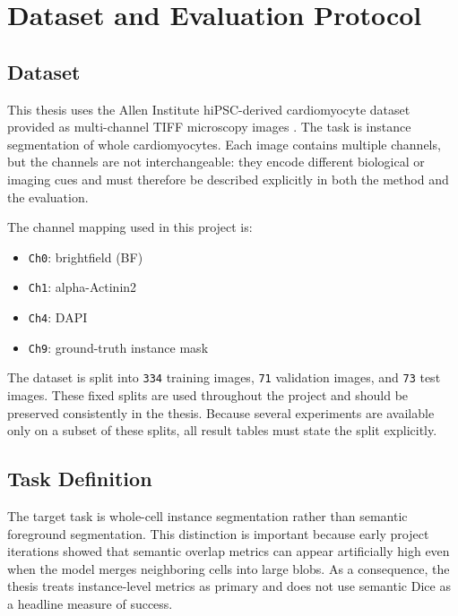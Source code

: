 \section{Dataset and Evaluation Protocol}\label{dataset-and-evaluation-protocol}

\subsection{Dataset}\label{dataset}

This thesis uses the Allen Institute hiPSC-derived cardiomyocyte dataset provided as multi-channel TIFF microscopy images \cite{rafelski2024allen}. The task is instance segmentation of whole cardiomyocytes. Each image contains multiple channels, but the channels are not interchangeable: they encode different biological or imaging cues and must therefore be described explicitly in both the method and the evaluation.

The channel mapping used in this project is:

\begin{itemize}
\tightlist
\item
  \texttt{Ch0}: brightfield (BF)
\item
  \texttt{Ch1}: alpha-Actinin2
\item
  \texttt{Ch4}: DAPI
\item
  \texttt{Ch9}: ground-truth instance mask
\end{itemize}

The dataset is split into \texttt{334} training images, \texttt{71} validation images, and \texttt{73} test images. These fixed splits are used throughout the project and should be preserved consistently in the thesis. Because several experiments are available only on a subset of these splits, all result tables must state the split explicitly.

\subsection{Task Definition}\label{task-definition}

The target task is whole-cell instance segmentation rather than semantic foreground segmentation. This distinction is important because early project iterations showed that semantic overlap metrics can appear artificially high even when the model merges neighboring cells into large blobs. As a consequence, the thesis treats instance-level metrics as primary and does not use semantic Dice as a headline measure of success.

